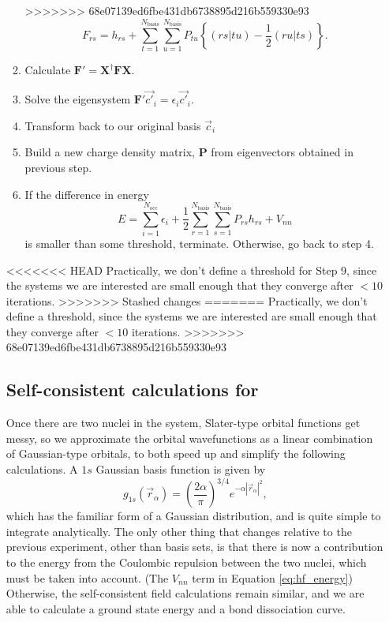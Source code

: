 \documentclass[journal=jacsat,manuscript=communication]{achemso}
\newcommand{\matr}[1]{\mathbf{#1}}
\begin{document}
\begin{enumerate}
\begin{enumerate}
>>>>>>> 68e07139ed6fbe431db6738895d216b559330e93
\begin{equation}
	F_{rs} = h_{rs} + \sum_{t=1}^{N_\mathrm{basis}}\sum_{u=1}^{N_\mathrm{basis}}P_{tu}\left\{(rs|tu) -\frac{1}{2}(ru|ts)\right\}.
\end{equation}
	\item Calculate $\matr{F}' = \matr{X}^\dag\matr{F}\matr{X}$.
	\item Solve the eigensystem $\matr{F}'\vec{c'}_i=\epsilon_i\vec{c'}_i$.
	\item Transform back to our original basis $\vec{c}_i$
	\item Build a new charge density matrix, $\matr{P}$ from eigenvectors obtained in previous step.
	\item If the difference in energy 
\begin{equation}
	E = \sum_{i=1}^{N_\mathrm{occ}}\epsilon_i + \frac{1}{2} \sum_{r=1}^{N_\mathrm{basis}} \sum_{s=1}^{N_\mathrm{basis}}P_{rs}h_{rs}+V_{nn}
	\label{eq:hf_energy}
\end{equation}
is smaller than some threshold, terminate.  Otherwise, go back to step 4.
\end{enumerate}
<<<<<<< HEAD
Practically, we don't define a threshold for Step 9, since the systems we are interested are small enough that they converge after $<10$ iterations. 
>>>>>>> Stashed changes
=======
Practically, we don't define a threshold, since the systems we are interested are small enough that they converge after $<10$ iterations. 
>>>>>>> 68e07139ed6fbe431db6738895d216b559330e93

\subsection{Self-consistent calculations for }
Once there are two nuclei in the system, Slater-type orbital functions get messy, so we approximate the orbital wavefunctions as a linear combination of Gaussian-type orbitals, to both speed up and simplify the following calculations.  A $1s$ Gaussian basis function is given by
\begin{equation}
	g_{1s}(\vec{r}_\alpha)=\left(\frac{2\alpha}{\pi}\right)^{3/4}e^{-\alpha|\vec{r}_\alpha|^2},
\end{equation}
which has the familiar form of a Gaussian distribution, and is quite simple to integrate analytically.  The only other thing that changes relative to the previous experiment, other than basis sets, is that there is now a contribution to the energy from the Coulombic repulsion between the two nuclei, which must be taken into account. (The $V_{nn}$ term in Equation \ref{eq:hf_energy})  Otherwise, the self-consistent field calculations remain similar, and we are able to calculate a ground state energy and a bond dissociation curve.

\end{enumerate}
\end{document}
